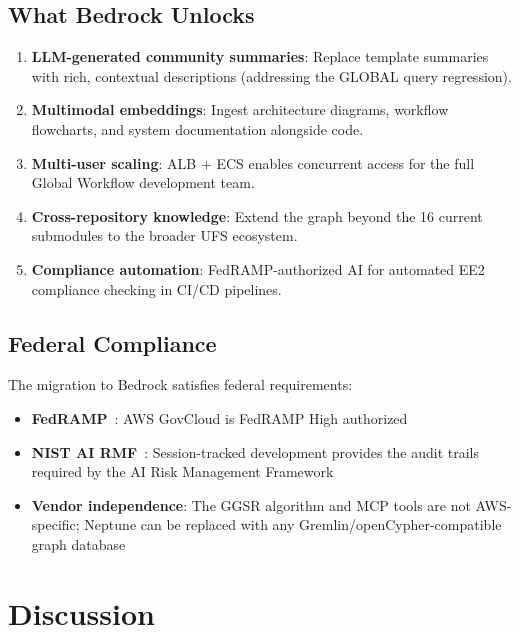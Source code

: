 \documentclass[11pt,letterpaper]{article}
\begin{document}
\subsection{What Bedrock Unlocks}

\begin{enumerate}[nosep]
    \item \textbf{LLM-generated community summaries}: Replace template
          summaries with rich, contextual descriptions (addressing the
          GLOBAL query regression).
    \item \textbf{Multimodal embeddings}: Ingest architecture diagrams,
          workflow flowcharts, and system documentation alongside code.
    \item \textbf{Multi-user scaling}: ALB + ECS enables concurrent
          access for the full Global Workflow development team.
    \item \textbf{Cross-repository knowledge}: Extend the graph beyond
          the 16 current submodules to the broader UFS ecosystem.
    \item \textbf{Compliance automation}: FedRAMP-authorized AI for
          automated EE2 compliance checking in CI/CD pipelines.
\end{enumerate}

\subsection{Federal Compliance}

The migration to Bedrock satisfies federal requirements:

\begin{itemize}[nosep]
    \item \textbf{FedRAMP}~\cite{fedramp2024}: AWS GovCloud is
          FedRAMP High authorized
    \item \textbf{NIST AI RMF}~\cite{nist_ai_rmf2023}: Session-tracked
          development provides the audit trails required by the AI Risk
          Management Framework
    \item \textbf{Vendor independence}: The GGSR algorithm and MCP tools
          are not AWS-specific; Neptune can be replaced with any
          Gremlin/openCypher-compatible graph database
\end{itemize}

\section{Discussion}
\label{sec:discussion}
\end{document}
